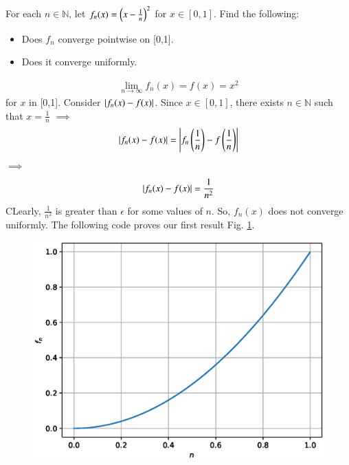 \documentclass[journal,12pt,twocolumn]{IEEEtran}
\begin{document}
\begin{problem}

For each $n \in \mathbb{N}$, let $f_n(x)=\left(x-\frac{1}{n}\right)^2$ for $x\in[0,1]$. Find the following:
\begin{itemize}
\item Does $f_n$ converge pointwise on [0,1].
\item Does it converge uniformly.   	
\end{itemize}  
\solution
\begin{align}
\lim_{n \to \infty}f_n(x) = f(x) = x^2
\end{align} for $x$ in [0,1].
Consider $\left\vert f_n(x)-f(x)\right\vert$. Since $x\in[0,1]$, there exists $n \in \mathbb{N}$ such that $x=\frac{1}{n}$
$\implies$ 
\begin{equation}
\left\vert f_n(x)-f(x)\right\vert = \left\vert f_n\left(\frac{1}{n}\right)-f\left(\frac{1}{n}\right)\right\vert   
\end{equation}
$\implies$
\begin{equation}
\left\vert f_n(x)-f(x)\right\vert=\frac{1}{n^2}
\end{equation}
CLearly, $\frac{1}{n^2}$ is greater than $\epsilon$ for some values of $n$. So, $f_n(x)$ does not converge uniformly.
The following code proves our first result Fig. \ref{fig:1}.


\begin{figure}[!ht]
\begin{center}
\includegraphics[width=\columnwidth]{./figs/2.eps}
\end{center}
\caption{}{}
\label{fig:1}	
\end{figure}
\end{problem}
\end{document}
